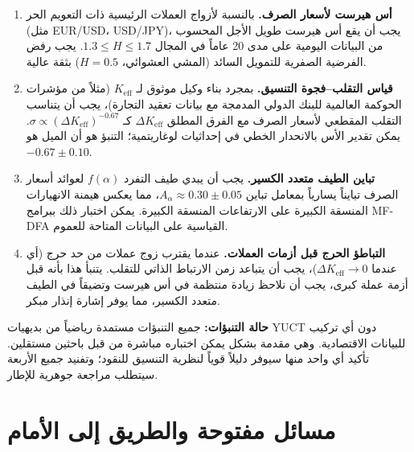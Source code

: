 \documentclass[12pt,a4paper]{article}
\theoremstyle{remark}
\begin{document}
	\begin{enumerate}[label=(\arabic*)]
		\item \textbf{أس هيرست لأسعار الصرف.} بالنسبة لأزواج العملات الرئيسية ذات التعويم الحر (مثل EUR/USD، USD/JPY)، يجب أن يقع أس هيرست طويل الأجل المحسوب من البيانات اليومية على مدى 20 عاماً في المجال \(1.3 \le H \le 1.7\). يجب رفض الفرضية الصفرية للتمويل السائد (المشي العشوائي، \(H = 0.5\)) بثقة عالية.
		
		\item \textbf{قياس التقلب–فجوة التنسيق.} بمجرد بناء وكيل موثوق لـ \(K_{\mathrm{eff}}\) (مثلاً من مؤشرات الحوكمة العالمية للبنك الدولي المدمجة مع بيانات تعقيد التجارة)، يجب أن يتناسب التقلب المقطعي لأسعار الصرف مع الفرق المطلق \(\Delta K_{\mathrm{eff}}\) كـ \(\sigma \propto (\Delta K_{\mathrm{eff}})^{-0.67}\). يمكن تقدير الأس بالانحدار الخطي في إحداثيات لوغاريتمية؛ التنبؤ هو أن الميل هو \(-0.67 \pm 0.10\).
		
		\item \textbf{تباين الطيف متعدد الكسير.} يجب أن يبدي طيف التفرد \(f(\alpha)\) لعوائد أسعار الصرف تبايناً يسارياً بمعامل تباين \(A_\alpha \approx 0.30 \pm 0.05\)، مما يعكس هيمنة الانهيارات المنسقة الكبيرة على الارتفاعات المنسقة الكبيرة. يمكن اختبار ذلك ببرامج MF-DFA القياسية على البيانات المتاحة للعموم.
		
		\item \textbf{التباطؤ الحرج قبل أزمات العملات.} عندما يقترب زوج عملات من حد حرج (أي عندما \(\Delta K_{\mathrm{eff}} \to 0\))، يجب أن يتباعد زمن الارتباط الذاتي للتقلب. يتنبأ هذا بأنه قبل أزمة عملة كبرى، يجب أن نلاحظ زيادة منتظمة في أس هيرست وتضيقاً في الطيف متعدد الكسير، مما يوفر إشارة إنذار مبكر.
	\end{enumerate}
	
	\textbf{حالة التنبؤات:} جميع التنبؤات مستمدة رياضياً من بديهيات YUCT دون أي تركيب للبيانات الاقتصادية. وهي مقدمة بشكل يمكن اختباره مباشرة من قبل باحثين مستقلين. تأكيد أي واحد منها سيوفر دليلاً قوياً لنظرية التنسيق للنقود؛ وتفنيد جميع الأربعة سيتطلب مراجعة جوهرية للإطار.
	
	\section{مسائل مفتوحة والطريق إلى الأمام}
	
\end{document}
